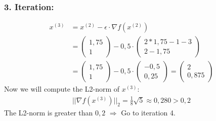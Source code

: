 \documentclass[a4paper]{article}
\begin{document}
        \subsubsection*{3. Iteration:}
            \begin{align*}
                x^{(3)} &= x^{(2)} - \epsilon \cdot \nabla f(x^{(2)})\\
                &= \left( \begin{matrix} 1,75 \\ 1 \end{matrix} \right) - 0,5 \cdot \left( \begin{matrix} 2*1,75-1-3 \\ 2-1,75 \end{matrix} \right)\\
                &= \left( \begin{matrix} 1,75 \\ 1 \end{matrix} \right) - 0,5 \cdot \left( \begin{matrix} -0,5 \\ 0,25 \end{matrix} \right)
                = \left( \begin{matrix} 2 \\ 0,875 \end{matrix} \right)
            \end{align*}
            Now we will compute the L2-norm of $x^{(3)}$:
            \begin{align*}
                ||\nabla f(x^{(3)})||_2 = \frac{1}{8} \sqrt{5} \approx 0,280 > 0,2
            \end{align*}
            The L2-norm is greater than $0,2$ $\Rightarrow$ Go to iteration 4.
\end{document}
